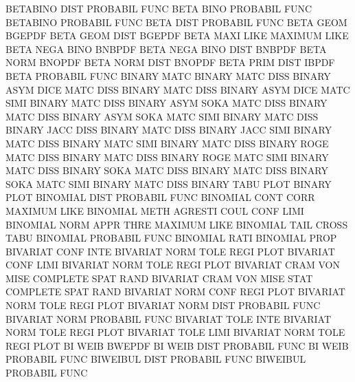 BETABINO DIST                           PROBABIL FUNC
BETA     BINO                           PROBABIL FUNC
BETABINO                                PROBABIL FUNC
BETA     DIST                           PROBABIL FUNC
BETA     GEOM                           BGEPDF
BETA     GEOM DIST                      BGEPDF
BETA     MAXI LIKE                      MAXIMUM  LIKE
BETA     NEGA BINO                      BNBPDF
BETA     NEGA BINO DIST                 BNBPDF
BETA     NORM                           BNOPDF
BETA     NORM DIST                      BNOPDF
BETA     PRIM DIST                      IBPDF
BETA                                    PROBABIL FUNC
BINARY   MATC                           BINARY   MATC DISS
BINARY   ASYM DICE MATC DISS            BINARY   MATC DISS
BINARY   ASYM DICE MATC SIMI            BINARY   MATC DISS
BINARY   ASYM SOKA MATC DISS            BINARY   MATC DISS
BINARY   ASYM SOKA MATC SIMI            BINARY   MATC DISS
BINARY   JACC DISS                      BINARY   MATC DISS
BINARY   JACC SIMI                      BINARY   MATC DISS
BINARY   MATC SIMI                      BINARY   MATC DISS
BINARY   ROGE MATC DISS                 BINARY   MATC DISS
BINARY   ROGE MATC SIMI                 BINARY   MATC DISS
BINARY   SOKA MATC DISS                 BINARY   MATC DISS
BINARY   SOKA MATC SIMI                 BINARY   MATC DISS
BINARY   TABU PLOT                      BINARY   PLOT
BINOMIAL DIST                           PROBABIL FUNC
BINOMIAL CONT CORR                      MAXIMUM  LIKE
BINOMIAL METH                           AGRESTI  COUL CONF LIMI
BINOMIAL NORM APPR THRE                 MAXIMUM  LIKE
BINOMIAL TAIL                           CROSS    TABU
BINOMIAL                                PROBABIL FUNC
BINOMIAL RATI                           BINOMIAL PROP
BIVARIAT CONF INTE                      BIVARIAT NORM TOLE REGI PLOT
BIVARIAT CONF LIMI                      BIVARIAT NORM TOLE REGI PLOT
BIVARIAT CRAM VON  MISE                 COMPLETE SPAT RAND
BIVARIAT CRAM VON  MISE STAT            COMPLETE SPAT RAND
BIVARIAT NORM CONF REGI PLOT            BIVARIAT NORM TOLE REGI PLOT
BIVARIAT NORM DIST                      PROBABIL FUNC
BIVARIAT NORM                           PROBABIL FUNC
BIVARIAT TOLE INTE                      BIVARIAT NORM TOLE REGI PLOT
BIVARIAT TOLE LIMI                      BIVARIAT NORM TOLE REGI PLOT
BI       WEIB                           BWEPDF
BI       WEIB DIST                      PROBABIL FUNC
BI       WEIB                           PROBABIL FUNC
BIWEIBUL DIST                           PROBABIL FUNC
BIWEIBUL                                PROBABIL FUNC
